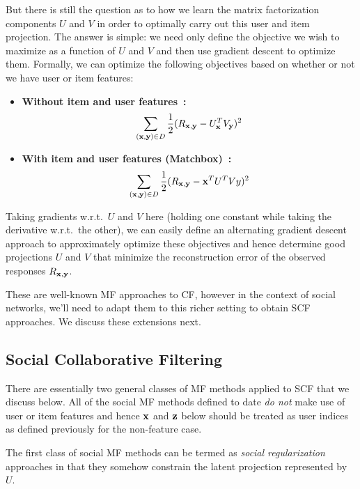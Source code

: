 But there is still the question as to how we learn the matrix
factorization components $U$ and $V$ in order to optimally carry out this
user and item projection.  The answer is simple: we need only
define the objective we wish to maximize as a function of $U$ and
$V$ and then use gradient descent to optimize them.  Formally,
we can optimize the following objectives based on whether or not
we have user or item features:
\begin{itemize}
\item {\bf Without item and user features~\cite{pmf}:}
\begin{align}
\sum_{(\mathbf{x},\mathbf{y}) \in D} \frac{1}{2} (R_{\mathbf{x},\mathbf{y}} - U_{\mathbf{x}}^T V_{\mathbf{y}})^2
\end{align}
\item {\bf With item and user features (Matchbox)~\cite{matchbox}:}
\begin{align}
\sum_{(\mathbf{x},\mathbf{y}) \in D} \frac{1}{2} (R_{\mathbf{x},\mathbf{y}} - \mathbf{x}^T U^T V y)^2
\end{align}
\end{itemize}
Taking gradients w.r.t.\ $U$ and $V$ here (holding one constant while
taking the derivative w.r.t.\ the other), we can easily define an
alternating gradient descent approach to approximately
optimize these objectives and hence determine good projections $U$
and $V$ that minimize the reconstruction error of the observed
responses $R_{\mathbf{x},\mathbf{y}}$.

These are well-known MF approaches to CF, however in the context of
social networks, we'll need to adapt them to this richer setting to
obtain SCF approaches.  We discuss these extensions next.

\subsection{Social Collaborative Filtering}

There are essentially two general classes of MF methods applied to SCF
that we discuss below.  
All of the social MF methods defined to date \emph{do not}
make use of user or item features and hence $\mathbf{x}$ and $\mathbf{z}$ below should be
treated as user indices as defined previously for the non-feature case.

The first class of social MF methods can be termed as \emph{social
regularization} approaches in that they somehow constrain the latent
projection represented by $U$.

